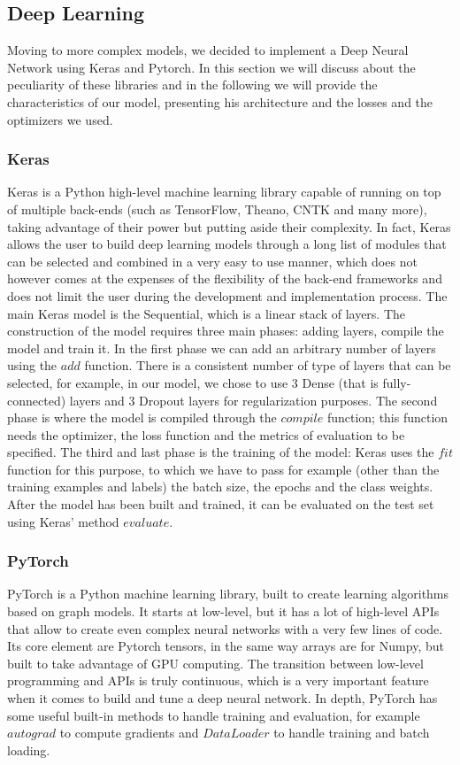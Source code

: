\documentclass[12pt]{article}
\begin{document}
\subsection{Deep Learning}
Moving to more complex models, we decided to implement a Deep Neural Network using Keras and Pytorch. In this section we will discuss about the peculiarity of these libraries and in the following we will provide the characteristics of our model, presenting his architecture and the losses and the optimizers we used.   

\subsubsection{Keras}
Keras is a Python high-level machine learning library capable of running on top of multiple back-ends (such as TensorFlow, Theano, CNTK and many more), taking advantage of their power but putting aside their complexity. In fact, Keras allows the user to build deep learning models through a long list of modules that can be selected and combined in a very easy to use manner, which does not however comes at the expenses of the flexibility of the back-end frameworks and does not limit the user during the development and implementation process. 
The main Keras model is the Sequential, which is a linear stack of layers. The construction of the model requires three main phases: adding layers, compile the model and train it. 
In the first phase we can add an arbitrary number of layers using the $add$ function. There is a consistent number of type of layers that can be selected, for example, in our model, we chose to use 3 Dense (that is fully-connected) layers and 3 Dropout layers for regularization purposes. 
The second phase is where the model is compiled through the $compile$ function; this function needs the optimizer, the loss function and the metrics of evaluation to be specified. 
The third and last phase is the training of the model: Keras uses the $fit$ function for this purpose, to which we have to pass for example (other than the training examples and labels) the batch size, the epochs and the class weights. 
After the model has been built and trained, it can be evaluated on the test set using Keras’ method $evaluate$.


\subsubsection{PyTorch}
PyTorch is a Python machine learning library, built to create learning algorithms based on graph models. 
It starts at low-level, but it has a lot of high-level APIs that allow to create even complex neural networks with a very few lines of code.
Its core element are Pytorch tensors, in the same way arrays are for Numpy, but built to take advantage of GPU computing.
The transition between low-level programming and APIs is truly continuous, which is a very important feature when it comes to build and tune a deep neural network.
In depth, PyTorch has some useful built-in methods to handle training and evaluation, for example $autograd$ to compute gradients and $DataLoader$ to handle training and batch loading.
\end{document}

